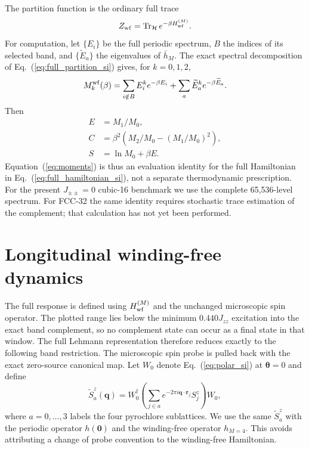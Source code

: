 \documentclass[aps,prl,onecolumn,amsmath,amssymb]{revtex4-2}
\newcommand{\Jzz}{J_{zz}}
\newcommand{\Jpp}{J_{\pm\pm}}
\newcommand{\bq}{\bm q}
\newcommand{\btheta}{\bm\theta}
\begin{document}
The partition function is the ordinary full trace
\begin{equation}
 Z_{\rm wf}=\operatorname{Tr}_{\mathcal H}e^{-\beta H_{\rm wf}^{(M)}}.
\label{eq:full_partition_si}
\end{equation}
For computation, let $\{E_i\}$ be the full periodic spectrum, $B$ the indices
of its selected band, and $\{\widetilde E_a\}$ the eigenvalues of $\bar h_M$.
The exact spectral decomposition of Eq.~(\ref{eq:full_partition_si}) gives,
for $k=0,1,2$,
\begin{equation}
 M_k^{\rm wf}(\beta)=
 \sum_{i\notin B}E_i^k e^{-\beta E_i}
 +\sum_a\widetilde E_a^k e^{-\beta\widetilde E_a}.
\label{eq:moments}
\end{equation}
Then
\begin{align}
 E&=M_1/M_0,\\
 C&=\beta^2\left(M_2/M_0-(M_1/M_0)^2\right),\\
 S&=\ln M_0+\beta E.
\end{align}
Equation~(\ref{eq:moments}) is thus an evaluation identity for the full
Hamiltonian in Eq.~(\ref{eq:full_hamiltonian_si}), not a separate
thermodynamic prescription.
For the present $\Jpp=0$ cubic-16 benchmark we use the complete
65,536-level spectrum.  For FCC-32 the same
identity requires stochastic trace estimation of the complement; that
calculation has not yet been performed.

\section{Longitudinal winding-free dynamics}

The full response is defined using $H_{\rm wf}^{(M)}$ and the unchanged
microscopic spin operator.  The plotted range lies below the minimum
$0.440\Jzz$ excitation into the exact band complement, so no complement state
can occur as a final state in that window.  The full Lehmann representation
therefore reduces exactly to the following band restriction.  The
microscopic spin probe is pulled back with the exact zero-source canonical map.
Let $W_0$ denote Eq.~(\ref{eq:polar_si}) at $\btheta=0$ and define
\begin{equation}
 \widetilde S_a^z(\bq)=W_0^\dagger
 \left(\sum_{j\in a}e^{-2\pi i\bq\cdot\bm r_j}S_j^z\right)W_0,
\label{eq:dssf_source_si}
\end{equation}
where $a=0,\ldots,3$ labels the four pyrochlore sublattices.  We use the same
$\widetilde S_a^z$ with the periodic operator $h(\bm0)$ and the winding-free
operator $h_{M=4}$.  This avoids attributing a change of probe convention to
the winding-free Hamiltonian.
\end{document}
